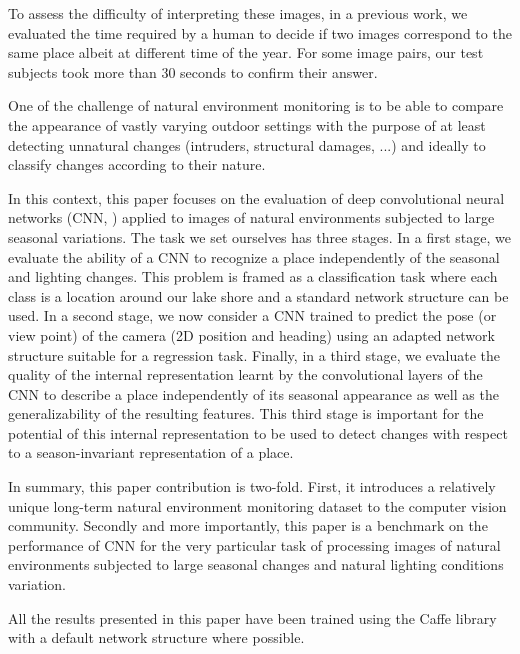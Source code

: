 To assess the difficulty of interpreting these images, in a
previous work, we evaluated the time required by a human to decide if two
images correspond to the same place albeit at different time of the year. For
some image pairs, our test subjects took more than 30 seconds to confirm their answer.  

One of the challenge of natural environment monitoring is to be able to compare
the appearance of vastly varying outdoor settings with the purpose of at least
detecting unnatural changes (intruders, structural damages, ...) and ideally to
classify changes according to their nature. 

In this context, this paper focuses on the evaluation of deep convolutional
neural networks (CNN, \cite{farabet-pami-13}) applied to images of natural environments
subjected to large seasonal variations. The task we set ourselves has three
stages. In a first stage, we evaluate the ability of a CNN to recognize a place
independently of the seasonal and lighting changes. This problem is framed as a
classification task where each class is a location around our lake shore and a
standard network structure can be used. In a
second stage, we now consider a CNN trained to predict the pose (or view point)
of the camera (2D position and heading) using an adapted network structure
suitable for a regression task. Finally, in a third stage, we evaluate the
quality of the internal representation learnt by the convolutional layers of
the CNN to describe a place independently of its seasonal appearance as well as
the generalizability of the resulting features. This third stage is important
for the potential of this internal representation to be used to detect changes
with respect to a season-invariant representation of a place. 

In summary, this paper contribution is two-fold. First, it introduces a
relatively unique long-term natural environment monitoring dataset to the
computer vision community.  Secondly and more importantly, this paper is a
benchmark on the performance of CNN for the very particular task of processing
images of natural environments subjected to large seasonal changes and natural
lighting conditions variation. 

All the results presented in this paper have been trained using the Caffe
library~\cite{jia2014caffe} with a default network structure where possible.  

% 
